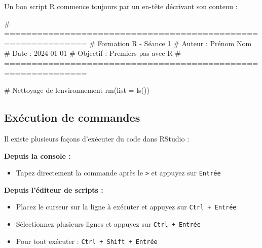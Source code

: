 \documentclass[
  french,
  11pt,
  a4paper,
]{article}
\newenvironment{Shaded}{}{}
\newcommand{\AttributeTok}[1]{\textcolor[rgb]{0.84,0.23,0.29}{#1}}
\newcommand{\CommentTok}[1]{\textcolor[rgb]{0.42,0.45,0.49}{#1}}
\newcommand{\FunctionTok}[1]{\textcolor[rgb]{0.44,0.26,0.76}{#1}}
\newcommand{\NormalTok}[1]{\textcolor[rgb]{0.14,0.16,0.18}{#1}}
\providecommand{\tightlist}{%
  \setlength{\itemsep}{0pt}\setlength{\parskip}{0pt}}
\begin{document}
\begin{tcolorbox}[enhanced jigsaw, arc=.35mm, bottomrule=.15mm, bottomtitle=1mm, breakable, colback=white, colbacktitle=quarto-callout-tip-color!10!white, colframe=quarto-callout-tip-color-frame, coltitle=black, left=2mm, leftrule=.75mm, opacityback=0, opacitybacktitle=0.6, rightrule=.15mm, title=\textcolor{quarto-callout-tip-color}{\faLightbulb}\hspace{0.5em}{Bonne pratique --- Organisation d'un script R}, titlerule=0mm, toprule=.15mm, toptitle=1mm]

Un bon script R commence toujours par un en-tête décrivant son contenu :

\begin{Shaded}
\begin{Highlighting}[]
\CommentTok{\# =============================================================}
\CommentTok{\# Formation R {-} Séance 1}
\CommentTok{\# Auteur : Prénom Nom}
\CommentTok{\# Date : 2024{-}01{-}01}
\CommentTok{\# Objectif : Premiers pas avec R}
\CommentTok{\# =============================================================}

\CommentTok{\# Nettoyage de l\textquotesingle{}environnement}
\FunctionTok{rm}\NormalTok{(}\AttributeTok{list =} \FunctionTok{ls}\NormalTok{())}
\end{Highlighting}
\end{Shaded}

\end{tcolorbox}

\subsection{Exécution de commandes}\label{exuxe9cution-de-commandes}

Il existe plusieurs façons d'exécuter du code dans RStudio :

\textbf{Depuis la console :}

\begin{itemize}
\tightlist
\item
  Tapez directement la commande après le \texttt{\textgreater{}} et
  appuyez sur \texttt{Entrée}
\end{itemize}

\textbf{Depuis l'éditeur de scripts :}

\begin{itemize}
\tightlist
\item
  Placez le curseur sur la ligne à exécuter et appuyez sur
  \texttt{Ctrl\ +\ Entrée}
\item
  Sélectionnez plusieurs lignes et appuyez sur \texttt{Ctrl\ +\ Entrée}
\item
  Pour tout exécuter : \texttt{Ctrl\ +\ Shift\ +\ Entrée}
\end{itemize}
\end{document}
